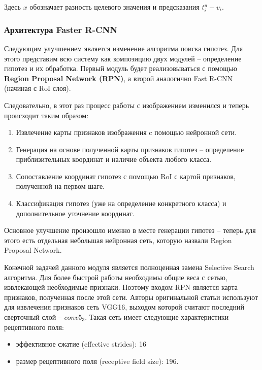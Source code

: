 Здесь $x$ обозначает разность целевого значения и предсказания $t_i^u - v_i$.

\subsubsection{Архитектура Faster R-CNN}

Следующим улучшением является изменение алгоритма поиска гипотез. Для этого представим всю систему как композицию двух модулей -- определение гипотез и их обработка. Первый модуль будет реализовываться с помощью \textbf{Region Proposal Network (RPN)}, а второй аналогично Fast R-CNN (начиная с RoI слоя).

Следовательно, в этот раз процесс работы с изображением изменился и теперь происходит таким образом:

\begin{enumerate}[1.]
	\item Извлечение карты признаков изображения c помощью нейронной сети.
	\item Генерация на основе полученной карты признаков гипотез -- определение приблизительных координат и наличие объекта любого класса.
	\item Сопоставление координат гипотез с помощью RoI с картой признаков, полученной на первом шаге.
	\item Классификация гипотез (уже на определение конкретного класса) и дополнительное уточнение координат.
\end{enumerate}

Основное улучшение произошло именно в месте генерации гипотез -- теперь для этого есть отдельная небольшая нейронная сеть, которую назвали Region Proposal Network.

Конечной задачей данного модуля является полноценная замена Selective Search алгоритма. Для более быстрой работы необходимы общие веса с сетью, извлекающей необходимые признаки. Поэтому входом RPN является карта признаков, полученная после этой сети. Авторы оригинальной статьи используют для извлечения признаков сеть VGG16, выходом которой считают последний сверточный слой -- $conv5_3$. Такая сеть имеет следующие характеристики рецептивного поля:

\begin{itemize}
    \item эффективное сжатие (effective strides): 16
    \item размер рецептивного поля (receptive field size): 196.
\end{itemize}

